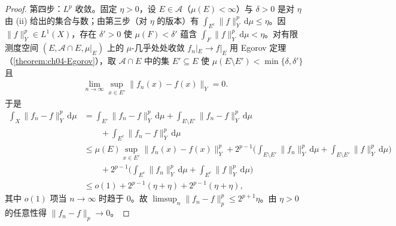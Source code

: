 \documentclass[../../main.tex]{subfiles}%
\begin{document}
\begin{proof}
第四步：$L^p$ 收敛。固定 $\eta>0$，设 $E\in\mathcal{A}$（$\mu(E)<\infty$）与 $\delta>0$ 是对 $\eta$ 由 (ii) 给出的集合与数；由第三步（对 $\eta$ 的版本）有 $\int_{E^c}\|f\|_Y^p\,\mathrm{d}\mu\leqslant\eta$。因 $\|f\|_Y^p\in L^1(X)$，存在 $\delta'>0$ 使 $\mu(F)<\delta'$ 蕴含 $\int_F\|f\|_Y^p\,\mathrm{d}\mu<\eta$。对有限测度空间 $(E,\mathcal{A}\cap E,\mu|_E)$ 上的 $\mu$-几乎处处收敛 $f_n|_E\to f|_E$ 用 Egorov 定理（\cref{theorem:ch04-Egorov}），取 $\mathcal{A}\cap E$ 中的集 $E'\subseteq E$ 使 $\mu(E\setminus E')<\min\{\delta,\delta'\}$ 且
\begin{align*}
\lim_{n\to\infty}\sup_{x\in E'}\|f_n(x)-f(x)\|_Y=0 .
\end{align*}
于是
\begin{align*}
\int_X\|f_n-f\|_Y^p\,\mathrm{d}\mu&=\int_{E'}\|f_n-f\|_Y^p\,\mathrm{d}\mu+\int_{E\setminus E'}\|f_n-f\|_Y^p\,\mathrm{d}\mu\\
&\qquad+\int_{E^c}\|f_n-f\|_Y^p\,\mathrm{d}\mu\\
&\leqslant\mu(E)\sup_{x\in E'}\|f_n(x)-f(x)\|_Y^p+2^{p-1}\Big(\int_{E\setminus E'}\|f_n\|_Y^p\,\mathrm{d}\mu+\int_{E\setminus E'}\|f\|_Y^p\,\mathrm{d}\mu\Big)\\
&\qquad +2^{p-1}\Big(\int_{E^c}\|f_n\|_Y^p\,\mathrm{d}\mu+\int_{E^c}\|f\|_Y^p\,\mathrm{d}\mu\Big)\\
&\leqslant o(1)+2^{p-1}(\eta+\eta)+2^{p-1}(\eta+\eta),
\end{align*}
其中 $o(1)$ 项当 $n\to\infty$ 时趋于 $0$。故 $\limsup_n\|f_n-f\|_p^p\leqslant2^{p+1}\eta$。由 $\eta>0$ 的任意性得 $\|f_n-f\|_p\to0$。
\end{proof}
\end{document}
